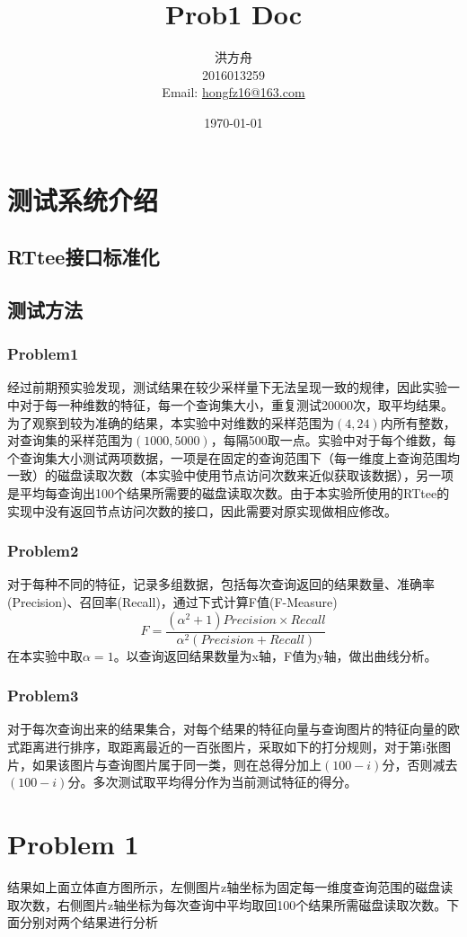\documentclass[12pt]{article}
\title{Prob1 Doc}
\author{洪方舟\\2016013259\\Email: \href{mailto:hongfz16@163.com}{hongfz16@163.com}}
\date{\today}
\begin{document}
  \maketitle
  \section*{测试系统介绍}
  	\subsection*{RTtee接口标准化}
  	\subsection*{测试方法}
  		\subsubsection*{Problem1}
  			经过前期预实验发现，测试结果在较少采样量下无法呈现一致的规律，因此实验一中对于每一种维数的特征，每一个查询集大小，重复测试20000次，取平均结果。为了观察到较为准确的结果，本实验中对维数的采样范围为$(4,24)$内所有整数，对查询集的采样范围为$(1000,5000)$，每隔500取一点。实验中对于每个维数，每个查询集大小测试两项数据，一项是在固定的查询范围下（每一维度上查询范围均一致）的磁盘读取次数（本实验中使用节点访问次数来近似获取该数据），另一项是平均每查询出100个结果所需要的磁盘读取次数。由于本实验所使用的RTtee的实现中没有返回节点访问次数的接口，因此需要对原实现做相应修改。
  		\subsubsection*{Problem2}
  			对于每种不同的特征，记录多组数据，包括每次查询返回的结果数量、准确率(Precision)、召回率(Recall)，通过下式计算F值(F-Measure)
  			\begin{equation*}
	  			F = \frac{(\alpha^2+1)Precision \times Recall}{\alpha^2(Precision+Recall)}
  			\end{equation*}
  			在本实验中取$\alpha=1$。以查询返回结果数量为x轴，F值为y轴，做出曲线分析。
  		\subsubsection*{Problem3}
  			对于每次查询出来的结果集合，对每个结果的特征向量与查询图片的特征向量的欧式距离进行排序，取距离最近的一百张图片，采取如下的打分规则，对于第i张图片，如果该图片与查询图片属于同一类，则在总得分加上$(100-i)$分，否则减去$(100-i)$分。多次测试取平均得分作为当前测试特征的得分。
  \section*{Problem 1}
  	结果如上面立体直方图所示，左侧图片z轴坐标为固定每一维度查询范围的磁盘读取次数，右侧图片z轴坐标为每次查询中平均取回100个结果所需磁盘读取次数。下面分别对两个结果进行分析
\end{document}
